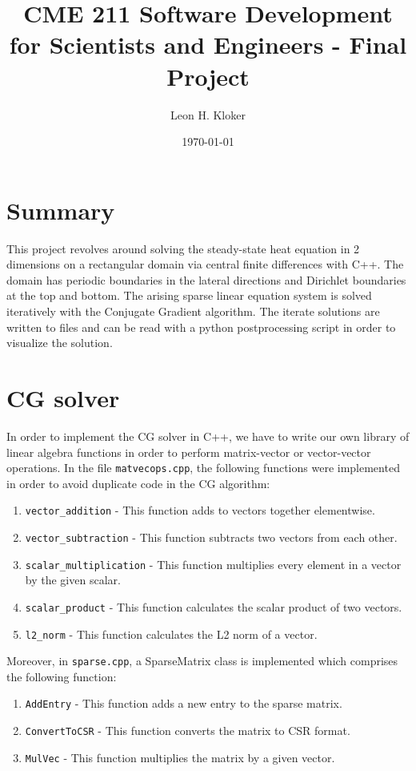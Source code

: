 \documentclass{article}
\title{CME 211 Software Development for Scientists and Engineers - Final Project}
\author{Leon H. Kloker}
\date{\today}
\begin{document}
\maketitle

\section{Summary}

This project revolves around solving the steady-state heat equation in 2 dimensions on a rectangular domain via central finite differences with C++. The domain has periodic boundaries in the lateral directions and Dirichlet boundaries at the top and bottom. The arising sparse linear equation system is solved iteratively with the Conjugate Gradient algorithm. The iterate solutions are written to files and can be read with a python postprocessing script in order to visualize the solution.

\section{CG solver}

In order to implement the CG solver in C++, we have to write our own library of linear algebra functions in order to perform matrix-vector or vector-vector operations. In the file \texttt{matvecops.cpp}, the following functions were implemented in order to avoid duplicate code in the CG algorithm: 
\begin{enumerate}

\item \texttt{vector\_addition} - This function adds to vectors together elementwise.

\item \texttt{vector\_subtraction} - This function subtracts two vectors from each other.

\item \texttt{scalar\_multiplication} - This function multiplies every element in a vector by the given scalar.

\item \texttt{scalar\_product} - This function calculates the scalar product of two vectors.

\item \texttt{l2\_norm} - This function calculates the L2 norm of a vector.
    
\end{enumerate}

Moreover, in \texttt{sparse.cpp}, a SparseMatrix class is implemented which comprises the following function:
\begin{enumerate}

\item \texttt{AddEntry} - This function adds a new entry to the sparse matrix.

\item \texttt{ConvertToCSR} - This function converts the matrix to CSR format.

\item \texttt{MulVec} - This function multiplies the matrix by a given vector.
    
\end{enumerate}
\end{document}
